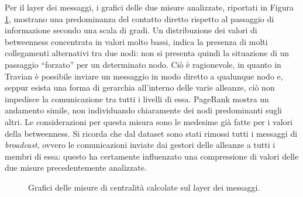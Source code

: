 Per il layer dei messaggi, i grafici delle due misure analizzate, riportati in Figura \ref{fig:messages_centrality}, mostrano una predominanza del contatto diretto rispetto al passaggio di informazione secondo una scala di gradi. Un distribuzione dei valori di betweenness concentrata in valori molto bassi, indica la presenza di molti collegamenti alternativi tra due nodi: non si presenta quindi la situazione di un passaggio “forzato” per un determinato nodo. Ciò è ragionevole, in quanto in Travian è possibile inviare un messaggio in modo diretto a qualunque nodo e, seppur esista una forma di gerarchia all'interno delle varie alleanze, ciò non impedisce la comunicazione tra tutti i livelli di essa. PageRank mostra un andamento simile, non individuando chiaramente dei nodi predominanti sugli altri. Le considerazioni per questa misura sono le medesime già fatte per i valori della betweenness. Si ricorda che dal dataset sono stati rimossi tutti i messaggi di \textit{broadcast}, ovvero le comunicazioni inviate dai gestori delle alleanze a tutti i membri di essa: questo ha certamente influenzato una compressione di valori delle due misure precedentemente analizzate.\\ 
\begin{figure}
	\hfill
	\caption{Grafici delle misure di centralità calcolate sul layer dei messaggi.}
	\label{fig:messages_centrality}
\end{figure}
